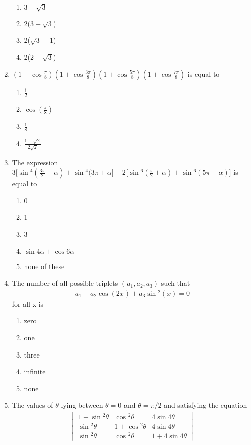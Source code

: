 \begin{enumerate}[label=\arabic*.,ref=\thesubsection.\theenumi]
\begin{enumerate}
       \item $3 - \sqrt3$
       \item 2($3 - \sqrt3$)
       \item 2($\sqrt3 - 1$)
       \item 2($2 - \sqrt3$)
   \end{enumerate}
    \item $(1+\cos{\frac{\pi}{8}})(1+\cos{\frac{3\pi}{8}})(1+\cos{\frac{5\pi}{8}})(1+\cos{\frac{7\pi}{8}})$ is equal to 
    \begin{enumerate}
        \item $\frac{1}{2}$
        \item $\cos{(\frac{\pi}{8})}$
        \item $\frac{1}{8}$
        \item $\frac{1+\sqrt2}{2\sqrt2}$
    \end{enumerate}
    \item The expression $3[\sin{^4(\frac{3\pi}{2}-\alpha)}+\sin{^4(3\pi+\alpha]}-2[\sin{^6(\frac{\pi}{2}+\alpha)}+\sin{^6(5\pi-\alpha)]}$ is equal to 
    \begin{enumerate}
        \item 0
        \item 1
        \item 3
        \item $\sin{4\alpha} + \cos{6\alpha}$
        \item none of these
    \end{enumerate}
    \item The number of all possible triplets $(a_1,a_2,a_3)$ such that \begin{align}
        a_1 + a_2\cos{(2x)} +a_3\sin{^2(x)} =0
    \end{align}
    for all x is 
    \begin{enumerate}
        \item zero
        \item one
        \item three
        \item infinite
        \item none
    \end{enumerate}
    \item The values of $\theta$ lying between $\theta = 0$ and $\theta =\pi/2$ and satisfying the equation
    \begin{align}
        \begin{vmatrix}
        1+\sin{^2\theta} & \cos{^2\theta} & 4\sin{4\theta} \\ \sin{^2\theta }& 1+\cos{^2\theta} & 4\sin{4\theta} \\ \sin{^2\theta} & \cos{^2\theta} & 1+4\sin{4\theta}

\end{vmatrix}
\end{align}
\end{enumerate}
